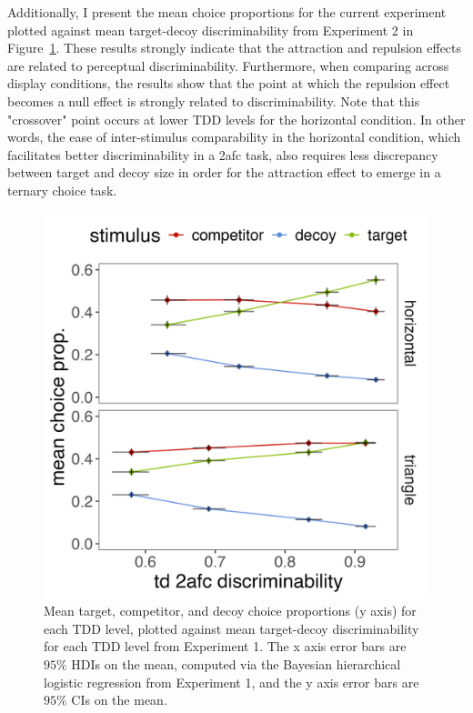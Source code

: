 Additionally, I present the mean choice proportions for the current experiment plotted against mean target-decoy discriminability from Experiment 2 in Figure~\ref{fig:e2_choice_compare_to_2afc}. These results strongly indicate that the attraction and repulsion effects are related to perceptual discriminability. Furthermore, when comparing across display conditions, the results show that the point at which the repulsion effect becomes a null effect is strongly related to discriminability. Note that this "crossover" point occurs at lower TDD levels for the horizontal condition. In other words, the ease of inter-stimulus comparability in the horizontal condition, which facilitates better discriminability in a 2afc task, also requires less discrepancy between target and decoy size in order for the attraction effect to emerge in a ternary choice task.

\begin{figure}
   \includegraphics[width=\textwidth]{figures/choicePhase_att_trials_compare_to_2afc_collapsed.jpeg}
   \caption{Mean target, competitor, and decoy choice proportions (y axis) for each TDD level, plotted against mean target-decoy discriminability for each TDD level from Experiment 1. The x axis error bars are $95\%$ HDIs on the mean, computed via the Bayesian hierarchical logistic regression from Experiment 1, and the y axis error bars are $95\%$ CIs on the mean.}
   \label{fig:e2_choice_compare_to_2afc}
\end{figure}

